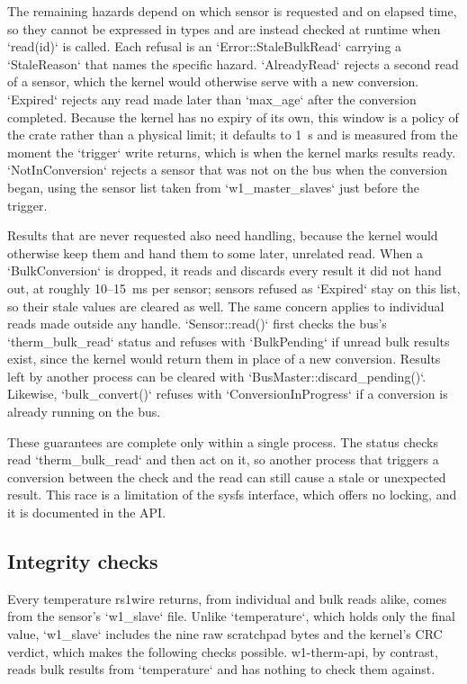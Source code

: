 \documentclass[conference]{IEEEtran}
\begin{document}
The remaining hazards depend on which sensor is requested and on elapsed time, so they cannot be expressed in types and are instead checked at runtime when `read(id)` is called.
Each refusal is an `Error::StaleBulkRead` carrying a `StaleReason` that names the specific hazard.
`AlreadyRead` rejects a second read of a sensor, which the kernel would otherwise serve with a new conversion.
`Expired` rejects any read made later than `max\_age` after the conversion completed.
Because the kernel has no expiry of its own, this window is a policy of the crate rather than a physical limit; it defaults to 1~s and is measured from the moment the `trigger` write returns, which is when the kernel marks results ready.
`NotInConversion` rejects a sensor that was not on the bus when the conversion began, using the sensor list taken from `w1\_master\_slaves` just before the trigger.

Results that are never requested also need handling, because the kernel would otherwise keep them and hand them to some later, unrelated read.
When a `BulkConversion` is dropped, it reads and discards every result it did not hand out, at roughly 10--15~ms per sensor; sensors refused as `Expired` stay on this list, so their stale values are cleared as well.
The same concern applies to individual reads made outside any handle.
`Sensor::read()` first checks the bus's `therm\_bulk\_read` status and refuses with `BulkPending` if unread bulk results exist, since the kernel would return them in place of a new conversion.
Results left by another process can be cleared with `BusMaster::discard\_pending()`.
Likewise, `bulk\_convert()` refuses with `ConversionInProgress` if a conversion is already running on the bus.

These guarantees are complete only within a single process.
The status checks read `therm\_bulk\_read` and then act on it, so another process that triggers a conversion between the check and the read can still cause a stale or unexpected result.
This race is a limitation of the sysfs interface, which offers no locking, and it is documented in the API.

\subsection{Integrity checks}

Every temperature rs1wire returns, from individual and bulk reads alike, comes from the sensor's `w1\_slave` file.
Unlike `temperature`, which holds only the final value, `w1\_slave` includes the nine raw scratchpad bytes and the kernel's CRC verdict, which makes the following checks possible. w1-therm-api, by contrast, reads bulk results from `temperature` and has nothing to check them against.
\end{document}
